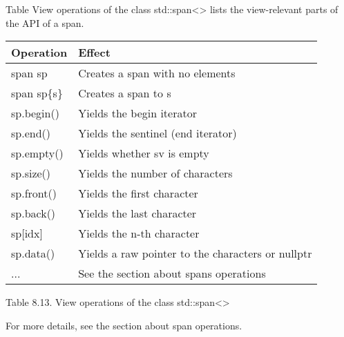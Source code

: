 
Table View operations of the class std::span<> lists the view-relevant parts of the API of a span.

\begin{longtable}[c]{|l|l|}
\hline
\textbf{Operation} & \textbf{Effect}                                   \\ \hline
\endfirsthead
%
\endhead
%
span sp            & Creates a span with no elements                   \\ \hline
span sp\{s\}       & Creates a span to s                               \\ \hline
sp.begin()         & Yields the begin iterator                         \\ \hline
sp.end()           & Yields the sentinel (end iterator)                \\ \hline
sp.empty()         & Yields whether sv is empty                        \\ \hline
sp.size()          & Yields the number of characters                   \\ \hline
sp.front()         & Yields the first character                        \\ \hline
sp.back()          & Yields the last character                         \\ \hline
sp{[}idx{]}        & Yields the n-th character                         \\ \hline
sp.data()          & Yields a raw pointer to the characters or nullptr \\ \hline
...                & See the section about spans operations            \\ \hline
\end{longtable}

\begin{center}
Table 8.13. View operations of the class std::span<>
\end{center}

For more details, see the section about span operations.









